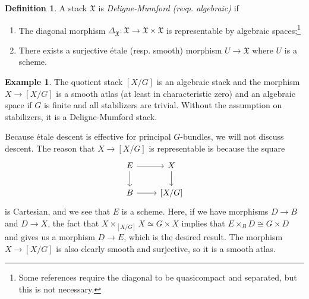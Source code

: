 \documentclass{amsart}
\theoremstyle{definition}
\newtheorem{defn}[thm]{Definition}
\newtheorem{exm}[thm]{Example}
\theoremstyle{remark}
\theoremstyle{plain}
\theoremstyle{definition}
\theoremstyle{remark}
\newcommand{\mf}[1]{\mathfrak{#1}}
\newcommand{\1}{\mathbf{1}}
\newcommand{\2}{\mathbf{2}}
\newcommand{\3}{\mathbf{3}}
\begin{document}
\begin{defn}
    A stack \(\mf{X}\) is \textit{Deligne-Mumford (resp. algebraic)} if
    \begin{enumerate}
        \item The diagonal morphism \(\Delta_{\mf{X}} \colon \mf{X} \to \mf{X} \times \mf{X}\) is representable by algebraic spaces;\footnote{Some references require the diagonal to be quasicompact and separated, but this is not necessary.}
        \item There exists a surjective \'etale (resp. smooth) morphism \(U \to \mf{X}\) where \(U\) is a scheme.
    \end{enumerate}
\end{defn}

\begin{exm}
    The quotient stack \([X/G]\) is an algebraic stack and the morphism \(X \to [X/G]\) is a smooth atlas (at least in characteristic zero) and an algebraic space if \(G\) is finite and all stabilizers are trivial. Without the assumption on stabilizers, it is a Deligne-Mumford stack.

    Because \'etale descent is effective for principal \(G\)-bundles, we will not discuss descent. The reason that \(X \to [X/G]\) is representable is because the square
    \begin{equation*}
    \begin{tikzcd}
        E \ar{r} \ar{d} & X \ar{d} \\
        B \ar{r} & {[X/G]}
    \end{tikzcd}
    \end{equation*}
    is Cartesian, and we see that \(E\) is a scheme. Here, if we have morphisms \(D \to B\) and \(D \to X\), the fact that \(X \times_{[X /G]} X \simeq G \times X\) implies that \(E \times_B D \cong G \times D\) and gives us a morphism \(D \to E\), which is the desired result. The morphism \(X \to [X/G]\) is also clearly smooth and surjective, so it is a smooth atlas.
\end{exm}
\end{document}
